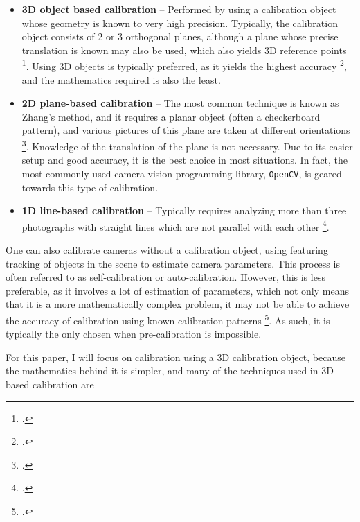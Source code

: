 \begin{itemize}[leftmargin=!, itemindent=-4ex]
    \item \textbf{3D object based calibration} -- Performed by using a calibration object whose geometry is known to very high precision. Typically, the calibration object consists of 2 or 3 orthogonal planes, although a plane whose precise translation is known may also be used, which also yields 3D reference points \footcite{zhangCameraCalibration2007}. Using 3D objects is typically preferred, as it yields the highest accuracy \footcite{zhangCameraCalibration2007}, and the mathematics required is also the least. 
    \item \textbf{2D plane-based calibration} -- The most common technique is known as Zhang's method, and it requires a planar object (often a checkerboard pattern), and various pictures of this plane are taken at different orientations \footcite{zhangFlexibleNew2000}. Knowledge of the translation of the plane is not necessary. Due to its easier setup and good accuracy, it is the best choice in most situations. In fact, the most commonly used camera vision programming library, \texttt{OpenCV}, is geared towards this type of calibration. 
    \item \textbf{1D line-based calibration} -- Typically requires analyzing more than three photographs with straight lines which are not parallel with each other \footcite{chuLineBasedCamera2005}. 
\end{itemize}

One can also calibrate cameras without a calibration object, using featuring tracking of objects in the scene to estimate camera parameters. This process is often referred to as self-calibration or auto-calibration. However, this is less preferable, as it involves a lot of estimation of parameters, which not only means that it is a more mathematically complex problem, it may not be able to achieve the accuracy of calibration using known calibration patterns \footcite{zhangCameraCalibration2007}. As such, it is typically the only chosen when pre-calibration is impossible. 

For this paper, I will focus on calibration using a 3D calibration object, because the mathematics behind it is simpler, and many of the techniques used in 3D-based calibration are 

